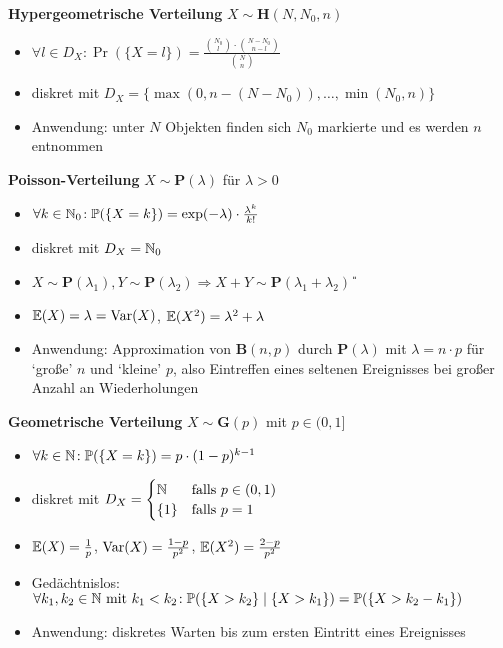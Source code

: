 \textbf{Hypergeometrische Verteilung} $X\sim\mathbf{H}(N,N_0,n)$
\begin{itemize}
\item $\forall l \in D_X\!: \Pr(\{X=l\})
  =\frac{\binom{N_0}{l} \cdot \binom{N-N_0}{n-l}}{\binom{N}{n}}$

\item diskret mit
  $D_X = \{\max(0,n-(N-N_0)),\ldots,\min(N_0,n)\}$

\item Anwendung: unter $N$ Objekten finden sich $N_0$ markierte und es werden
  $n$ entnommen
\end{itemize}

\textbf{Poisson-Verteilung} $X\sim\mathbf{P}(\lambda)$ für $\lambda > 0$
\begin{itemize}
\item $\forall k\in\mathbb{N}_0\!:
  \mathbb{P}(\{X=k\}) = \exp(-\lambda) \cdot \frac{\lambda^k}{k!}$

\item diskret mit $D_X = \mathbb{N}_0$

\item $X\sim\mathbf{P}(\lambda_1), Y\sim\mathbf{P}(\lambda_2)
  \Rightarrow X+Y\sim\mathbf{P}(\lambda_1 + \lambda_2)$ \U

\item $\mathbb{E}(X) = \lambda = \operatorname{Var}(X)$, $\mathbb{E}(X^2) = \lambda^2 + \lambda$

\item Anwendung: Approximation von $\mathbf{B}(n,p)$ durch $\mathbf{P}(\lambda)$
  mit $\lambda = n \cdot p$ für `große' $n$ und `kleine' $p$, also Eintreffen
  eines seltenen Ereignisses bei großer Anzahl an Wiederholungen
\end{itemize}

\newpage
\textbf{Geometrische Verteilung} $X\sim\mathbf{G}(p)$ mit $p \in (0,1]$
\begin{itemize}
\item $\forall k\in\mathbb{N}\!: \mathbb{P}(\{X=k\}) = p \cdot (1-p)^{k-1}$

\item diskret mit $D_X = \begin{cases}
\mathbb{N}              & \text{falls } p \in (0,1)  \\
\{1\}           & \text{falls } p = 1
\end{cases}$

\item $\mathbb{E}(X) = \frac{1}{p}$, $\operatorname{Var}(X) = \frac{1-p}{p^2}$,
  $\mathbb{E}(X^2) = \frac{2-p}{p^2}$

\item Gedächtnislos:\\ $\forall k_1,k_2\in\mathbb{N} \text{ mit } k_1 < k_2\!:
  \mathbb{P}(\{X > k_2\} \mid \{X > k_1\}) = \mathbb{P}(\{X > k_2 - k_1\})$

\item Anwendung: diskretes Warten bis zum ersten Eintritt eines Ereignisses
\end{itemize}

